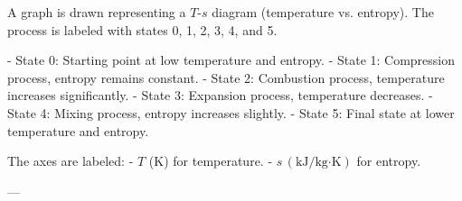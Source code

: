 A graph is drawn representing a \( T \)-\( s \) diagram (temperature vs. entropy). The process is labeled with states 0, 1, 2, 3, 4, and 5.  

- State 0: Starting point at low temperature and entropy.  
- State 1: Compression process, entropy remains constant.  
- State 2: Combustion process, temperature increases significantly.  
- State 3: Expansion process, temperature decreases.  
- State 4: Mixing process, entropy increases slightly.  
- State 5: Final state at lower temperature and entropy.  

The axes are labeled:  
- \( T \) (K) for temperature.  
- \( s \, (\text{kJ}/\text{kg·K}) \) for entropy.  

---